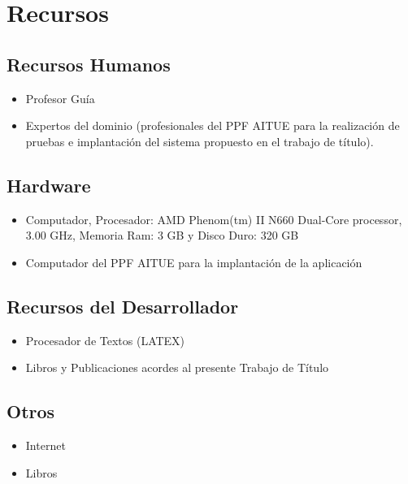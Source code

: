\documentclass[12pt,letterpaper]{article}
\begin{document}
\newpage

\section{Recursos}
\label{rec}


\subsection{Recursos Humanos}
  \begin{itemize}
    \item Profesor Gu\'ia
    \item Expertos del dominio (profesionales del PPF AITUE para la realización de pruebas e implantación del sistema propuesto en el trabajo de título). 
  \end{itemize}
\subsection{Hardware}
\begin{itemize}
    \item Computador, Procesador: AMD Phenom(tm) II N660 Dual-Core processor, 3.00 GHz, Memoria Ram: 3 GB y Disco Duro: 320 GB
    \item Computador del PPF AITUE para la implantación de la aplicación
  \end{itemize}
\subsection{Recursos del Desarrollador}
  \begin{itemize}
    \item Procesador de Textos (LATEX)
    \item Libros y Publicaciones acordes al presente Trabajo de Título
  \end{itemize}

\subsection{Otros}
  \begin{itemize}
    \item Internet 
    \item Libros  
  \end{itemize}

\newpage
\clearpage



\end{document}
